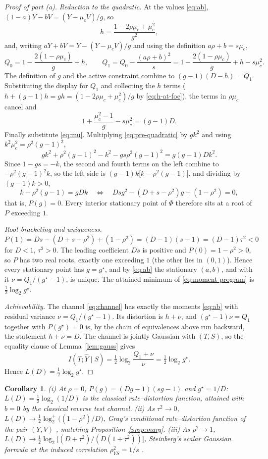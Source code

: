 \documentclass[11pt,onecolumn]{IEEEtran}
\newtheorem{corollary}[theorem]{Corollary}
\newcommand{\hY}{\widehat{Y}}
\begin{document}
\begin{proof}[Proof of part (a)]
\emph{Reduction to the quadratic.} At the values \eqref{eq:ab},
$(1-a)Y-bV=(Y-\mu_cV)/g$, so
\begin{equation}
h=\frac{1-2\rho\mu_c+\mu_c^2}{g^2},
\label{eq:h-at-foc}
\end{equation}
and, writing $aY+bV=Y-(Y-\mu_cV)/g$ and using the definition
$a\rho+b=s\mu_c$,
\[
Q_0=1-\frac{2(1-\rho\mu_c)}{g}+h,
\qquad
Q_1=Q_0-\frac{(a\rho+b)^2}{s}
=1-\frac{2(1-\rho\mu_c)}{g}+h-s\mu_c^2 .
\]
The definition of $g$ and the active constraint combine to
$(g-1)(D-h)=Q_1$. Substituting the display for $Q_1$ and collecting
the $h$ terms ($h+(g-1)h=gh=(1-2\rho\mu_c+\mu_c^2)/g$ by
\eqref{eq:h-at-foc}), the terms in $\rho\mu_c$ cancel and
\begin{equation}
1+\frac{\mu_c^2-1}{g}-s\mu_c^2=(g-1)D .
\label{eq:pre-quadratic}
\end{equation}
Finally substitute \eqref{eq:mu}. Multiplying
\eqref{eq:pre-quadratic} by $gk^2$ and using
$k^2\mu_c^2=\rho^2(g-1)^2$,
\[
gk^2+\rho^2(g-1)^2-k^2-gs\rho^2(g-1)^2=g(g-1)Dk^2 .
\]
Since $1-gs=-k$, the second and fourth terms on the left combine to
$-\rho^2(g-1)^2k$, so the left side is
$(g-1)k\bigl[k-\rho^2(g-1)\bigr]$, and dividing by $(g-1)k>0$,
\[
k-\rho^2(g-1)=gDk
\quad\Longleftrightarrow\quad
Dsg^2-(D+s-\rho^2)g+(1-\rho^2)=0,
\]
that is, $P(g)=0$. Every interior stationary point of $\Phi$ therefore
sits at a root of $P$ exceeding $1$.

\emph{Root bracketing and uniqueness.}
$P(1)=Ds-(D+s-\rho^2)+(1-\rho^2)=(D-1)(s-1)=(D-1)\tau^2<0$ for $D<1$,
$\tau^2>0$. The leading coefficient $Ds$ is positive and
$P(0)=1-\rho^2>0$, so $P$ has two real roots, exactly one exceeding
$1$ (the other lies in $(0,1)$). Hence every stationary point has
$g=g^\star$, and by \eqref{eq:ab} the stationary $(a,b)$, and with it
$\nu=Q_1/(g^\star-1)$, is unique. The attained minimum of
\eqref{eq:moment-program} is $\tfrac12\log_2 g^\star$.

\emph{Achievability.} The channel \eqref{eq:channel} has exactly the
moments \eqref{eq:ab} with residual variance $\nu=Q_1/(g^\star-1)$. Its
distortion is $h+\nu$, and $(g^\star-1)\nu=Q_1$ together with
$P(g^\star)=0$ is, by the chain of equivalences above run backward,
the statement $h+\nu=D$. The channel is jointly Gaussian with $(T,S)$,
so the equality clause of Lemma~\ref{lem:gauss} gives
\[
I(T;\hY\mid S)=\tfrac12\log_2\frac{Q_1+\nu}{\nu}=\tfrac12\log_2 g^\star .
\]
Hence $L(D)=\tfrac12\log_2 g^\star$.
\end{proof}

\begin{corollary}\label{cor:anchors}
(i) At $\rho=0$, $P(g)=(Dg-1)(sg-1)$ and $g^\star=1/D$:
$L(D)=\tfrac12\log_2(1/D)$ is the classical rate--distortion function,
attained with $b=0$ by the classical reverse test channel.
(ii) As $\tau^2\to0$,
$L(D)\to\tfrac12\log_2^{+}\bigl((1-\rho^2)/D\bigr)$, Gray's
conditional rate--distortion function of the pair $(Y,V)$
\cite{gray1973}, matching Proposition~\ref{prop:marg}.
(iii) As $\rho^2\to1$,
$L(D)\to\tfrac12\log_2\bigl[(D+\tau^2)/(D(1+\tau^2))\bigr]$,
Steinberg's scalar Gaussian formula at the induced correlation
$\rho_{YS}^2=1/s$ \cite{steinberg2009}.
\end{corollary}
\end{document}
